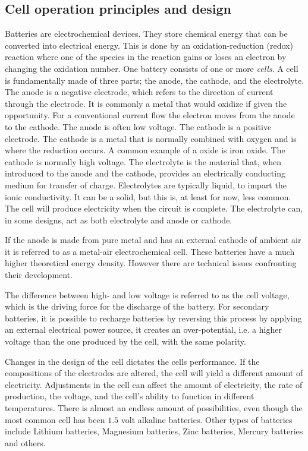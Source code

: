 \subsection{Cell operation principles and design}
Batteries are electrochemical devices. They store chemical energy that can be converted into electrical energy. This is done by an oxidation-reduction (redox) reaction where one of the species in the reaction gains or loses an electron by changing the oxidation number.  One battery consists of one or more \textit{cells}. A cell is fundamentally made of three parts; the anode, the cathode, and the electrolyte.
The anode is a negative electrode, which refers to the direction of current through the electrode. It is commonly a metal that would oxidize if given the opportunity. For a conventional current flow the electron moves from the anode to the cathode. The anode is often low voltage.
The cathode is a positive electrode. The cathode is a metal that is normally combined with oxygen and is where the reduction occurs. A common example of a oxide is iron oxide. The cathode is normally high voltage.
The electrolyte is the material that, when introduced to the anode and the cathode, provides an electrically conducting medium for transfer of charge. Electrolytes are typically liquid, to impart the ionic conductivity. It can be a solid, but this is, at least for now, less common. The cell will produce electricity when the circuit is complete. The electrolyte can, in some designs, act as both electrolyte and anode or cathode.

If the anode is made from pure metal and has an external cathode of ambient air it is referred to as a metal-air electrochemical cell. These batteries have a much higher theoretical energy density. However there are technical issues confronting their development. \cite{li2017metal}

The difference between high- and low voltage is referred to as the cell voltage, which is the driving force for the discharge of the battery. For secondary batteries, it is possible to recharge batteries by reversing this process by applying an external electrical power source, it creates an over-potential, i.e. a higher voltage than the one produced by the cell, with the same polarity.

Changes in the design of the cell dictates the cells performance. If the compositions of the electrodes are altered, the cell will yield a different amount of electricity. Adjustments in the cell can affect the amount of electricity, the rate of production, the voltage, and the cell's ability to function in different temperatures. There is almost an endless amount of possibilities, even though the most common cell has been $1.5$ volt alkaline batteries. Other types of batteries include Lithium  batteries, Magnesium batteries, Zinc batteries,  Mercury batteries and others.

